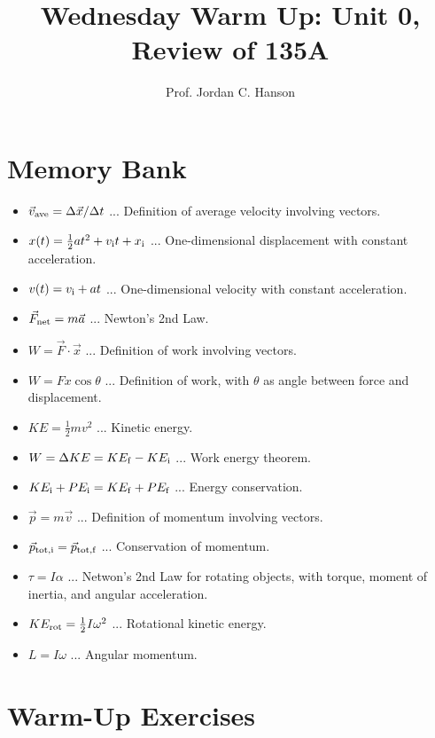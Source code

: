 \documentclass{article}
\begin{document}
\title{Wednesday Warm Up: Unit 0, Review of 135A}
\author{Prof. Jordan C. Hanson}

\maketitle

\section{Memory Bank}

\begin{itemize}
\item $\vec{v}_{\rm ave} = \Delta\vec{x}/\Delta t$ ... Definition of average velocity involving vectors.
\item $x(t) = \frac{1}{2}at^2 + v_{\rm i} t + x_{\rm i}$ ... One-dimensional displacement with constant acceleration.
\item $v(t) = v_{\rm i} + a t$ ... One-dimensional velocity with constant acceleration. 
\item $\vec{F}_{\rm net} = m\vec{a}$ ... Newton's 2nd Law.
\item $W = \vec{F} \cdot \vec{x}$ ... Definition of work involving vectors.
\item $W = Fx\cos\theta$ ... Definition of work, with $\theta$ as angle between force and displacement.
\item $KE = \frac{1}{2} m v^2$ ... Kinetic energy.
\item $W = \Delta KE = KE_{\rm f} - KE_{\rm i}$ ... Work energy theorem.
\item $KE_{\rm i} + PE_{\rm i} = KE_{\rm f} + PE_{\rm f}$ ... Energy conservation.
\item $\vec{p} = m\vec{v}$ ... Definition of momentum involving vectors.
\item $\vec{p}_{\rm tot,i} = \vec{p}_{\rm tot,f}$ ... Conservation of momentum.
\item $\tau = I\alpha$ ... Netwon's 2nd Law for rotating objects, with torque, moment of inertia, and angular acceleration.
\item $KE_{\rm rot} = \frac{1}{2}I \omega^2$ ... Rotational kinetic energy.
\item $L = I \omega$ ... Angular momentum.
\end{itemize}

\clearpage

\section{Warm-Up Exercises}
\end{document}
